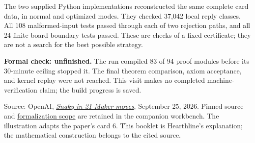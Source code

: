 \documentclass[11pt]{article}
\newcommand{\sectiontitle}[1]{\par\vspace{0.5em}{\Large\sffamily\bfseries\color{ink}#1}\par}
\begin{document}
\sectiontitle{What we checked on this visit}
The two supplied Python implementations reconstructed the same complete card
data, in normal and optimized modes. They checked 37,042 local reply classes.
All 108 malformed-input tests passed through each of two rejection paths, and
all 24 finite-board boundary tests passed. These are checks of a fixed
certificate; they are not a search for the best possible strategy.

\textbf{Formal check: unfinished.} The run compiled 83 of 94 proof modules
before its 30-minute ceiling stopped it. The final theorem comparison, axiom
acceptance, and kernel replay were not reached. This visit makes no completed
machine-verification claim; the build progress is saved.

\vfill
{\footnotesize\color{muted}
Source: OpenAI, \href{https://github.com/openai/math/blob/adc7f1241b42e322a6451854ab7e4b4c146bf78a/preprints/Snaky-in-21-Maker-moves-September-25-2026/article.pdf}{\emph{Snaky in 21 Maker moves}}, September 25, 2026.
Pinned source and \href{https://github.com/openai/math/blob/adc7f1241b42e322a6451854ab7e4b4c146bf78a/lean/docs/187.md}{formalization scope} are retained in the companion workbench.
The illustration adapts the paper's card 6. This booklet is Hearthline's
explanation; the mathematical construction belongs to the cited source.}
\end{document}
